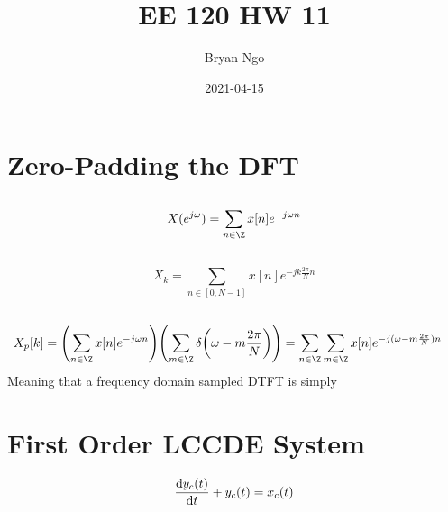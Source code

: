 \documentclass{article}
\title{EE 120 HW 11}
\author{Bryan Ngo}
\date{2021-04-15}
\begin{document}
\maketitle

\section{Zero-Padding the DFT}

\subsection{}

\begin{equation}
    X(e^{j \omega}) = \sum_{n \in \Z} x[n] e^{-j \omega n}
\end{equation}

\subsection{}

\begin{equation}
    X_k = \sum_{n \in [0, N - 1]} x[n] e^{-j k \frac{2\pi}{N} n}
\end{equation}

\subsection{}

\begin{align}
    X_p[k] = \qty(\sum_{n \in \Z} x[n] e^{-j \omega n}) \qty(\sum_{m \in \Z} \delta\qty(\omega - m \frac{2\pi}{N}))
    &= \sum_{n \in \Z} \sum_{m \in \Z} x[n] e^{-j (\omega - m\frac{2\pi}{N}) n}
\end{align}
Meaning that a frequency domain sampled DTFT is simply 

\subsection{}

\subsection{}

\section{First Order LCCDE System}

\begin{equation}
    \dv{y_c(t)}{t} + y_c(t) = x_c(t)
\end{equation}
\end{document}
